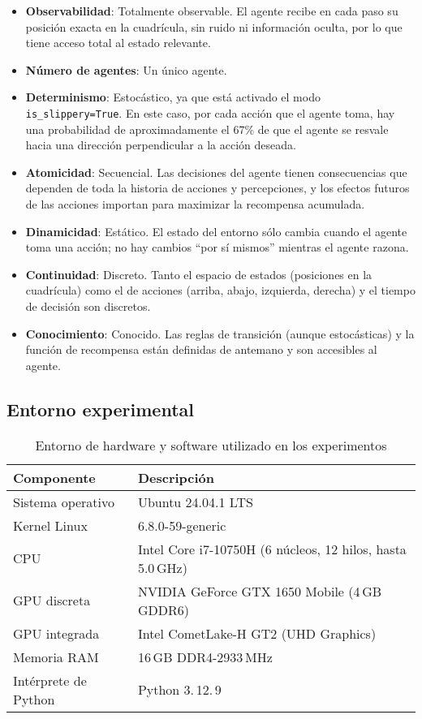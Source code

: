 \begin{itemize}
    \item \textbf{Observabilidad}: Totalmente observable. El agente recibe en cada paso su posición exacta en la cuadrícula, sin ruido ni información oculta, por lo que tiene acceso total al estado relevante.
    \item \textbf{Número de agentes}: Un único agente.
    \item \textbf{Determinismo}: Estocástico, ya que está activado el modo \texttt{is\_slippery=True}. En este caso, por cada acción que el agente toma, hay una probabilidad de aproximadamente el 67\% de que el agente se resvale hacia una dirección perpendicular a la acción deseada.
    \item \textbf{Atomicidad}: Secuencial. Las decisiones del agente tienen consecuencias que dependen de toda la historia de acciones y percepciones, y los efectos futuros de las acciones importan para maximizar la recompensa acumulada.
    \item \textbf{Dinamicidad}: Estático. El estado del entorno sólo cambia cuando el agente toma una acción; no hay cambios “por sí mismos” mientras el agente razona.
    \item \textbf{Continuidad}: Discreto. Tanto el espacio de estados (posiciones en la cuadrícula) como el de acciones (arriba, abajo, izquierda, derecha) y el tiempo de decisión son discretos.
    \item \textbf{Conocimiento}: Conocido. Las reglas de transición (aunque estocásticas) y la función de recompensa están definidas de antemano y son accesibles al agente.
\end{itemize}

\subsection{Entorno experimental}

\begin{table}[H]
  \centering
  \begin{tabular}{@{} ll @{}}
    \toprule
    \textbf{Componente} & \textbf{Descripción} \\
    \midrule
    Sistema operativo      & Ubuntu 24.04.1 LTS \\
    Kernel Linux           & 6.8.0-59-generic \\
    CPU                    & Intel Core i7-10750H (6 núcleos, 12 hilos, hasta 5.0\,GHz) \\
    GPU discreta           & NVIDIA GeForce GTX 1650 Mobile (4\,GB GDDR6) \\
    GPU integrada          & Intel CometLake-H GT2 (UHD Graphics) \\
    Memoria RAM            & 16\,GB DDR4-2933\,MHz \\
    Intérprete de Python   & Python 3.\,12.\,9\quad \\
    \bottomrule
  \end{tabular}
  \caption{Entorno de hardware y software utilizado en los experimentos}
  \label{tab:entorno-experimental}
\end{table}